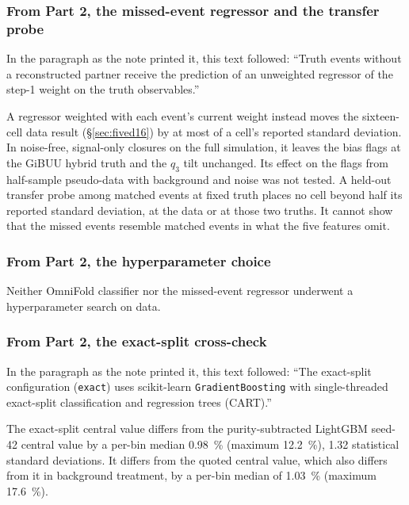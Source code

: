 \subsubsection{From Part 2, the missed-event regressor and the transfer probe}
In the paragraph as the note printed it, this text followed: ``Truth events without a reconstructed partner receive the prediction of an unweighted regressor of the step-1 weight on the truth observables.''\par
A regressor weighted with each event's current weight instead moves the sixteen-cell data result (\S\ref{sec:fived16}) by at most  of a cell's reported standard deviation. In noise-free, signal-only closures on the full simulation, it leaves the bias flags at the GiBUU hybrid truth and the $q_3$ tilt unchanged. Its effect on the flags from half-sample pseudo-data with background and noise was not tested. A held-out transfer probe among matched events at fixed truth places no cell beyond half its reported standard deviation, at the data or at those two truths. It cannot show that the missed events resemble matched events in what the five features omit.

\subsubsection{From Part 2, the hyperparameter choice}
Neither OmniFold classifier nor the missed-event regressor underwent a hyperparameter search on data.

\subsubsection{From Part 2, the exact-split cross-check}
In the paragraph as the note printed it, this text followed: ``The exact-split configuration (\texttt{exact}) uses scikit-learn \texttt{GradientBoosting} with single-threaded exact-split classification and regression trees (CART).''\par
The exact-split central value differs from the purity-subtracted LightGBM seed-42 central value by a per-bin median \SI{0.98}{\percent} (maximum \SI{12.2}{\percent}), 1.32 statistical standard deviations. It differs from the quoted central value, which also differs from it in background treatment, by a per-bin median of \SI{1.03}{\percent} (maximum \SI{17.6}{\percent}).

